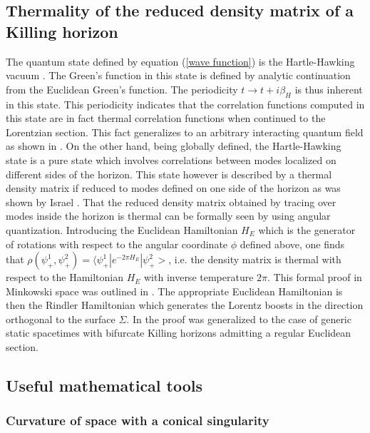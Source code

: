 \documentclass[12pt]{article}
\begin{document}
\subsection{Thermality of the reduced density matrix of a Killing horizon}
\label{section:formal proof}
The quantum state defined by equation (\ref{wave function}) is the Hartle-Hawking vacuum \cite{Hartle:1976tp}. The Green's function in this state is defined by analytic continuation from the Euclidean Green's function. The periodicity $t\rightarrow t+i\beta_H$ is thus inherent in this state. This periodicity indicates that the correlation functions computed in this state  are in fact thermal correlation functions when continued to the Lorentzian section. This fact generalizes to an arbitrary interacting quantum field as shown in \cite{Gibbons:1976pt}. On the other hand, being globally defined, the Hartle-Hawking state is a pure state which involves correlations between modes localized on different sides of the horizon. This state however is described by a thermal density matrix if reduced to modes defined on one side of the horizon as was shown by Israel \cite{Israel:1976ur}. 
That the reduced density matrix obtained by tracing over modes inside the horizon is thermal  can be formally seen by using angular quantization. Introducing the Euclidean Hamiltonian $H_E$ which is the generator of rotations with respect to the angular coordinate $\phi$ defined above, one finds that $\rho(\psi_+^1,\psi_+^2)=\langle\psi_+^1|e^{-2\pi H_E}|\psi^2_+>$, i.e. the density matrix is thermal with respect to the Hamiltonian $H_E$ with  inverse temperature $2\pi$. This formal proof in Minkowski space  was outlined in \cite{Kabat:1994vj}. The appropriate Euclidean Hamiltonian is then the Rindler Hamiltonian which generates the Lorentz boosts in the direction orthogonal to the surface $\Sigma$.
In \cite{Jacobson:1994fp} the proof was generalized to the case of  generic static spacetimes with bifurcate Killing horizons admitting a regular Euclidean section. 





\subsection{Useful mathematical tools}
\label{section:tools}

\subsubsection{Curvature of  space with a conical singularity}
\label{section: conical curvature}
\end{document}
